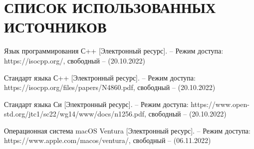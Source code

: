 \section*{СПИСОК ИСПОЛЬЗОВАННЫХ ИСТОЧНИКОВ}

\begingroup
\renewcommand{\section}[2]{}

\begin{thebibliography}{10}
	
	Язык программирования С++  [Электронный ресурс]. -- Режим доступа: 
	https://isocpp.org/, 
	свободный -- (20.10.2022)


	Стандарт языка С++  [Электронный ресурс]. -- Режим доступа: 
	https://isocpp.org/files/papers/N4860.pdf,
	свободный -- (20.10.2022)
	

	Стандарт языка Си  [Электронный ресурс]. -- Режим доступа: 
	https://www.open-std.org/jtc1/sc22/wg14/www/docs/n1256.pdf,
	свободный -- (20.10.2022)
	
	Операционная система macOS Ventura  [Электронный ресурс]. – Режим доступа: 
	https://www.apple.com/macos/ventura/, 
	свободный -- (06.11.2022)

\end{thebibliography}
\endgroup

\pagebreak





